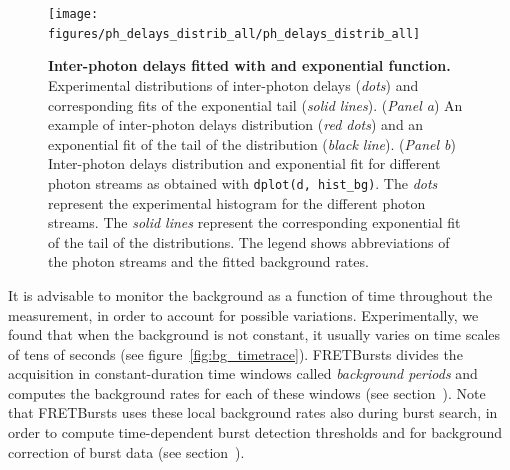 \documentclass[10pt,letterpaper]{article}
\begin{document}
\begin{figure}[h!]
\begin{center}
\texttt{[image: figures/ph\_delays\_distrib\_all/ph\_delays\_distrib\_all]}
\caption{\label{fig:bg_dist_all} \textbf{Inter-photon delays fitted with and exponential function.}
Experimental distributions of inter-photon delays (\textit{dots}) and
corresponding fits of the exponential tail (\textit{solid lines}).
(\textit{Panel a}) An example of inter-photon delays distribution (\textit{red dots}) and an exponential fit
of the tail of the distribution (\textit{black line}).
(\textit{Panel b}) Inter-photon delays distribution and exponential fit for different photon streams as obtained with \texttt{dplot(d, hist\_bg)}. The \textit{dots} represent the experimental histogram for the different photon streams. The \textit{solid lines} represent the corresponding exponential fit of the tail of the distributions. The legend shows abbreviations of the photon streams
and the fitted background rates.%
}
\end{center}
\end{figure}

It is advisable to monitor the background as a function of time
throughout the measurement, in order to account for possible variations.
Experimentally, we found that when the background is not constant,
it usually varies
on time scales of tens of seconds (see figure~\ref{fig:bg_timetrace}).
FRETBursts divides the acquisition in constant-duration time
windows called \textit{background periods} and computes the background rates for
each of these windows (see section~).
Note that FRETBursts uses these local background rates also during burst search,
in order to compute time-dependent burst detection thresholds
and for background correction of burst data (see section~).
\end{document}
